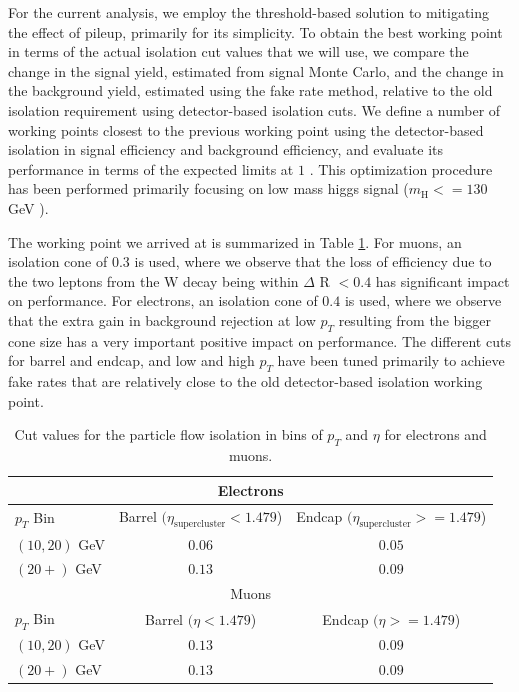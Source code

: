 For the current analysis, we employ the threshold-based solution to mitigating the effect of pileup,
primarily for its simplicity. To obtain the best working point in terms of the actual isolation
cut values that we will use, we compare the change in the signal yield, estimated from signal
Monte Carlo, and the change in the background yield, estimated using the fake rate method,
relative to the old isolation requirement using detector-based isolation cuts. We define a number
of working points closest to the previous working point using the detector-based isolation in
signal efficiency and background efficiency, and evaluate its performance in terms of the
expected limits at $1$ \ifb. This optimization procedure has been performed primarily focusing on
low mass higgs signal ($m_{\mathrm{H}} <= 130$ GeV ). 

The working point we arrived at is summarized in Table \ref{tab:PFIsoWorkingPoint}. For muons, an isolation cone of
$0.3$ is used, where we observe that the loss of efficiency due to the two leptons from the
W decay being within $\Delta$ R $ < 0.4$ has significant impact on performance. For electrons, an
isolation cone of $0.4$ is used, where we observe that the extra gain in background rejection
at low $p_{T}$ resulting from the bigger cone size has a very important positive impact on 
performance. The different cuts for barrel and endcap, and low and high $p_{T}$ have been tuned
primarily to achieve fake rates that are relatively close to the old detector-based
isolation working point.

\begin{table}[!htbp]
\begin{center}
\begin{tabular}{|l|c|c|}
\hline
\multicolumn{3}{|c|}{Electrons} \\
\hline
$p_{T}$ Bin      & Barrel $(\eta_{\mathrm{supercluster}} < 1.479$) & Endcap $(\eta_{\mathrm{supercluster}} >= 1.479$) \\
\hline
$(10,20)$ GeV  &  $0.06$    & $0.05$     \\
$(20+)$ GeV    &  $0.13$    & $0.09$     \\
\hline
\multicolumn{3}{|c|}{Muons} \\
\hline
$p_{T}$ Bin      & Barrel $(\eta < 1.479$) & Endcap $(\eta >= 1.479$) \\

\hline
$(10,20)$ GeV  &  $0.13$    & $0.09$     \\
$(20+)$ GeV    &  $0.13$    & $0.09$     \\

\hline
\end{tabular}
\caption{Cut values for the particle flow isolation in bins of $p_{T}$ and $\eta$ for electrons
and muons.  }
\label{tab:PFIsoWorkingPoint}
\end{center}
\end{table}

